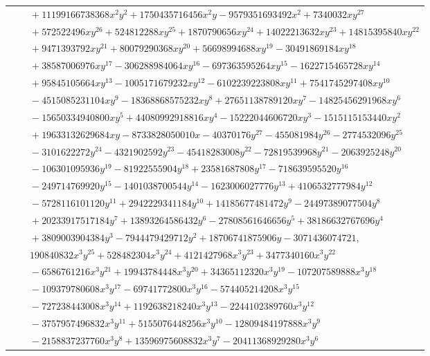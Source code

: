 \documentclass[11pt]{article}
\begin{document}
\begin{longtable}{@{}ll@{}}
 & $\quad +11199166738368x^{2}y^{2}+1750435716456x^{2}y-9579351693492x^{2}+7340032xy^{27}$\\
 & $\quad +572522496xy^{26}+524812288xy^{25}+1870790656xy^{24}+14022213632xy^{23}+14815395840xy^{22}$\\
 & $\quad +9471393792xy^{21}+80079290368xy^{20}+56698994688xy^{19}-30491869184xy^{18}$\\
 & $\quad +38587006976xy^{17}-306288984064xy^{16}-697363595264xy^{15}-1622715465728xy^{14}$\\
 & $\quad +95845105664xy^{13}-1005171679232xy^{12}-6102239223808xy^{11}+7541745297408xy^{10}$\\
 & $\quad -4515085231104xy^{9}-18368868575232xy^{8}+27651138789120xy^{7}-14825456291968xy^{6}$\\
 & $\quad -15650334940800xy^{5}+44080992918816xy^{4}-15222044606720xy^{3}-1515115153440xy^{2}$\\
 & $\quad +19633132629684xy-8733828050010x-40370176y^{27}-455081984y^{26}-2774532096y^{25}$\\
 & $\quad -3101622272y^{24}-4321902592y^{23}-45418283008y^{22}-72819539968y^{21}-2063925248y^{20}$\\
 & $\quad -106301095936y^{19}-81922555904y^{18}+23581687808y^{17}-718639595520y^{16}$\\
 & $\quad -249714769920y^{15}-1401038700544y^{14}-1623006027776y^{13}+4106532777984y^{12}$\\
 & $\quad -5728116101120y^{11}+2942229341184y^{10}+14185677481472y^{9}-24497389077504y^{8}$\\
 & $\quad +20233917517184y^{7}+13893264586432y^{6}-27808561646656y^{5}+38186632767696y^{4}$\\
 & $\quad +3809003904384y^{3}-7944479429712y^{2}+18706741875906y-3071436074721,$\\
 & $\quad 190840832x^{3}y^{25}+528482304x^{3}y^{24}+4121427968x^{3}y^{23}+3477340160x^{3}y^{22}$\\
 & $\quad -6586761216x^{3}y^{21}+19943784448x^{3}y^{20}+34365112320x^{3}y^{19}-107207589888x^{3}y^{18}$\\
 & $\quad -109379780608x^{3}y^{17}-69741772800x^{3}y^{16}-574405214208x^{3}y^{15}$\\
 & $\quad -727238443008x^{3}y^{14}+1192638218240x^{3}y^{13}-2244102389760x^{3}y^{12}$\\
 & $\quad -3757957496832x^{3}y^{11}+5155076448256x^{3}y^{10}-12809484197888x^{3}y^{9}$\\
 & $\quad -2158837237760x^{3}y^{8}+13596975608832x^{3}y^{7}-20411368929280x^{3}y^{6}$\\

\end{longtable}
\end{document}
